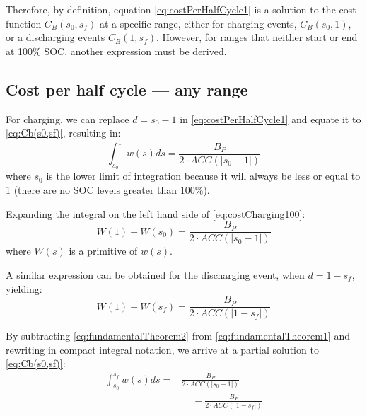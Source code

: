\documentclass{ieeeaccess}
\begin{document}
    Therefore, by definition, equation \eqref{eq:costPerHalfCycle1} is a solution to the cost function $C_{B}(s_{0}, s_{f})$ at a specific range, either for charging events, $C_{B}(s_{0}, 1)$, or a discharging events $C_{B}(1, s_{f})$. However, for ranges that neither start or end at 100\% SOC, another expression must be derived.

    \subsection{Cost per half cycle --- any range}

    For charging, we can replace $d=s_{0}-1$ in \eqref{eq:costPerHalfCycle1} and equate it to \eqref{eq:Cb(s0,sf)}, resulting in:
    \begin{equation}
        \int_{s_{0}}^{1}w(s)ds = \frac{B_{P}}{2 \cdot ACC(|s_{0}-1|)}
        \label{eq:costCharging100}
    \end{equation}
    where $s_{0}$ is the lower limit of integration because it will always be less or equal to 1 (there are no SOC levels greater than 100\%).

    Expanding the integral on the left hand side of \eqref{eq:costCharging100}:
    \begin{equation}
        W(1) - W(s_{0}) = \frac{B_{P}}{2 \cdot ACC(|s_{0}-1|)}
        \label{eq:fundamentalTheorem1}
    \end{equation}
    where $W(s)$ is a primitive of $w(s)$.

    A similar expression can be obtained for the discharging event, when $d=1-s_{f}$, yielding:
    \begin{equation}
        W(1) - W(s_{f}) = \frac{B_{P}}{2 \cdot ACC(|1-s_{f}|)}
        \label{eq:fundamentalTheorem2}
    \end{equation}

    By subtracting \eqref{eq:fundamentalTheorem2} from \eqref{eq:fundamentalTheorem1} and rewriting in compact integral notation, we arrive at a partial solution to \eqref{eq:Cb(s0,sf)}:
    \begin{equation}
        \begin{aligned}
            \int_{s_{0}}^{s_{f}}w(s)ds = & \frac{B_{P}}{2 \cdot ACC(|s_{0}-1|)}            \\
            & \;\;\;\; - \frac{B_{P}}{2 \cdot ACC(|1-s_{f}|)}
        \end{aligned}
        \label{eq:partialSolution}
    \end{equation}
\end{document}
